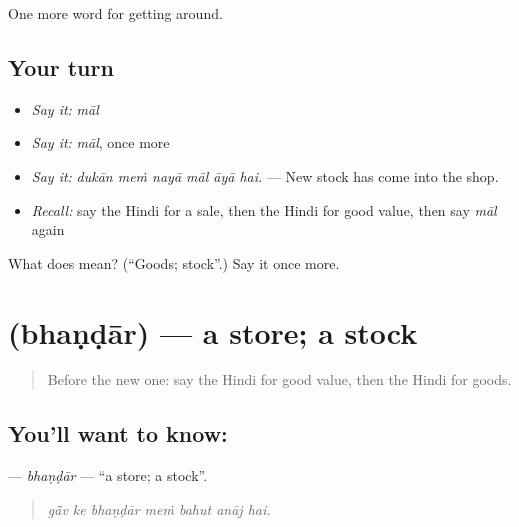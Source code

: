 \begin{grammarlens}[title={What you've built}]
One more word for getting around.
\end{grammarlens}

\subsection*{Your turn}
\begin{itemize}
\raggedright
  \item \emph{Say it:} \emph{māl}
  \item \emph{Say it:} \emph{māl}, once more
  \item \emph{Say it:} \emph{dukān meṁ nayā māl āyā hai.} — New stock has come into the shop.
  \item \emph{Recall:} say the Hindi for a sale, then the Hindi for good value, then say \emph{māl} again
\end{itemize}

\begin{tcolorbox}[breakable,colback=teal!4,colframe=teal!35!black,title={Before you move on}]
What does  mean? (\textquotedblleft{}Goods; stock\textquotedblright{}.) Say it once more.
\end{tcolorbox}
\section[\texorpdfstring{\hi{भंडार} (bhaṇḍār)}{भंडार (bhaṇḍār)}]{ (bhaṇḍār) — a store; a stock}

\label{lesson:HI-C432-bhandar}



\begin{quote}
Before the new one: say the Hindi for good value, then the Hindi for goods.
\end{quote}

\subsection*{You'll want to know: }
\textbf{} — \emph{bhaṇḍār} — \textquotedblleft{}a store; a stock\textquotedblright{}.

\begin{quote}
      
\end{quote}

\begin{quote}
\emph{gā̃v ke bhaṇḍār meṁ bahut anāj hai.}
\end{quote}

